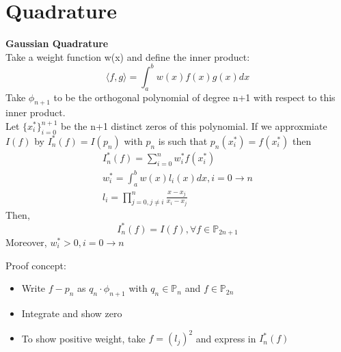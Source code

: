 \documentclass{article}
\begin{document}
\section{Quadrature}
\begin{theorem}
\textbf{Gaussian Quadrature}
\\
Take a weight function w(x) and define the inner product:
$$
\langle f, g \rangle = \int_a^b w(x)f(x)g(x) dx
$$
Take $\phi_{n+1}$ to be the orthogonal polynomial of degree n+1 with respect to this inner product. \\ Let $\{x_i^* \}_{i=0}^{n+1}$ be the n+1 distinct zeros of this polynomial. If we approxmiate $I(f)$ by $I^*_n(f) = I(p_n)$ with $p_n$ is such that $p_n(x_i^*) = f(x_i^*) $ then 
\begin{align*}
I^*_n(f) = \sum_{i=0}^n w^*_i f(x_i^*) \\
w^*_i = \int_a^b w(x)l_i(x) dx, i = 0 \to n \\
l_i = \prod_{j=0, j \ne i}^n \frac{x-x_j}{x_i-x_j}
\end{align*}
Then,
$$
I_n^*(f) = I(f) , \forall f \in \mathbb{P}_{2n +1}
$$
Moreover, $w_i^* > 0 , i=0\to n$  
\end{theorem}
Proof concept:
\begin{itemize}
    \item Write $f-p_n$ as $q_n \cdot \phi_{n+1}$ with $q_n \in \mathbb{P}_n$ and $f \in \mathbb{P}_{2n}$
    \item Integrate and show zero
    \item To show positive weight, take $f = (l_j)^2$ and express in $I_n^*(f)$
\end{itemize}
\end{document}
